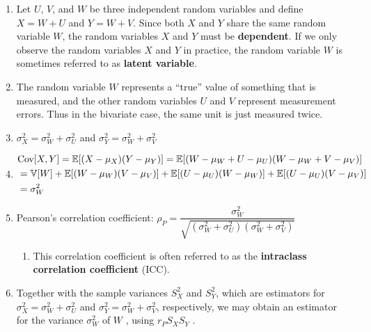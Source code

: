 \begin{enumerate}
    \item Let $U$, $V$, and $W$ be three independent random variables and define $X = W + U$ and $Y = W + V$.
    Since both $X$ and $Y$ share the same random variable $W$, the random variables $X$ and $Y$ must be \textbf{dependent}.
    If we only observe the random variables $X$ and $Y$ in practice, the random variable $W$ is sometimes referred to as \textbf{latent variable}.
    \hfill \cite{statistics/book/Statistics-for-Data-Scientists/Maurits-Kaptein}

    \item The random variable $W$ represents a “true” value of something that is measured, and the other random variables $U$ and $V$ represent measurement errors.
    Thus in the bivariate case, the same unit is just measured twice.
    \hfill \cite{statistics/book/Statistics-for-Data-Scientists/Maurits-Kaptein}

    \item $\sigma^2_X = \sigma^2_W + \sigma^2_U$ and $\sigma^2_Y = \sigma^2_W + \sigma^2_V$
    \hfill \cite{statistics/book/Statistics-for-Data-Scientists/Maurits-Kaptein}

    \item 
    $
        \begin{aligned}
            &\text{Cov}[X, Y] 
            = \mathbb{E}[(X - \mu_X )(Y - \mu_Y )]
            = \mathbb{E}[(W - \mu_W + U - \mu_U )(W - \mu_W + V - \mu_V )] \\
            &= \mathbb{V}[W] + \mathbb{E}[(W - \mu_W )(V - \mu_V )] + \mathbb{E}[(U - \mu_U )(W - \mu_W )] + \mathbb{E}[(U - \mu_U )(V - \mu_V )] \\
            &= \sigma^2_W
        \end{aligned}
    $
    \hfill \cite{statistics/book/Statistics-for-Data-Scientists/Maurits-Kaptein}

    \item Pearson’s correlation coefficient: 
    $
        \rho_P 
        = \dfrac{\sigma^2_W }{\sqrt{(\sigma^2_W + \sigma^2_U )(\sigma^2_W + \sigma^2_V )}}
    $
    \hfill \cite{statistics/book/Statistics-for-Data-Scientists/Maurits-Kaptein}
    \begin{enumerate}
        \item This correlation coefficient is often referred to as the \textbf{intraclass correlation coefficient} (ICC).
        \hfill \cite{statistics/book/Statistics-for-Data-Scientists/Maurits-Kaptein}
    \end{enumerate}

    \item Together with the sample variances $S^2_X$ and $S^2_Y $, which are estimators for $\sigma^2_X = \sigma^2_W + \sigma^2_U$ and $\sigma^2_Y = \sigma^2_W + \sigma^2_V $, respectively, we may obtain an estimator for the variance $\sigma^2_W$ of $W$ , using $r_P S_X S_Y$ .
    \hfill \cite{statistics/book/Statistics-for-Data-Scientists/Maurits-Kaptein}
\end{enumerate}


